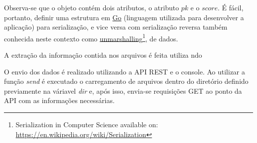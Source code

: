 \documentclass[a4paper, 12pt]{article}
\begin{document}
Observa-se que o objeto contém dois atributos, o atributo \(pk\) e o \(score\). É
fácil, portanto, definir uma estrutura em \uline{Go} (linguagem utilizada para
desenvolver a aplicação) para serialização, e vice versa com serialização
reversa também conhecida neste contexto como \uline{unmarshalling}\footnote{Serialization in Computer Science available on: \url{https://en.wikipedia.org/wiki/Serialization}}, de dados.

A extração da informação contida nos arquivos é feita utiliza ndo

O envio dos dados é realizado utilizando a API REST e o console. Ao utilizar a
função \emph{send} é executado o carregamento de arquivos dentro do diretório
definido previamente na váriavel \emph{dir} e, após isso, envia-se requisições GET
ao ponto da API com as informações necessárias.
\end{document}
